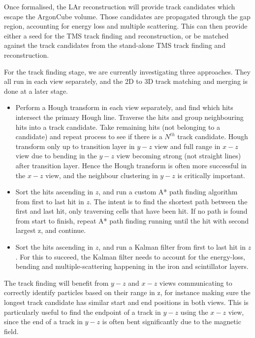 Once formalised, the LAr reconstruction will provide track candidates which escape the ArgonCube volume. Those candidates are propagated through the gap region, accounting for energy loss and multiple scattering. This can then provide either a seed for the TMS track finding and reconstruction, or be matched against the track candidates from the stand-alone TMS track finding and reconstruction.

For the track finding stage, we are currently investigating three approaches. They all run in each view separately, and the 2D to 3D track matching and merging is done at a later stage.

\begin{itemize}
    \item Perform a Hough transform in each view separately, and find which hits intersect the primary Hough line. Traverse the hits and group neighbouring hits into a track candidate. Take remaining hits (not belonging to a candidate) and repeat process to see if there is a $N^{th}$ track candidate. Hough transform only up to transition layer in $y-z$ view and full range in $x-z$ view due to bending in the $y-z$ view becoming strong (not straight lines) after transition layer. Hence the Hough transform is often more successful in the $x-z$ view, and the neighbour clustering in $y-z$ is critically important.

    \item Sort the hits ascending in $z$, and run a custom A* path finding algorithm from first to last hit in $z$. The intent is to find the shortest path between the first and last hit, only traversing cells that have been hit. If no path is found from start to finish, repeat A* path finding running until the hit with second largest z, and continue.
    
    \item Sort the hits ascending in $z$, and run a Kalman filter from first to last hit in $z$. For this to succeed, the Kalman filter needs to account for the energy-loss, bending and multiple-scattering happening in the iron and scintillator layers. 
\end{itemize}

The track finding will benefit from $y-z$ and $x-z$ views communicating to correctly identify particles based on their range in z, for instance making sure the longest track candidate has similar start and end positions in both views. This is particularly useful to find the endpoint of a track in $y-z$ using the $x-z$ view, since the end of a track in $y-z$ is often bent significantly due to the magnetic field. 

